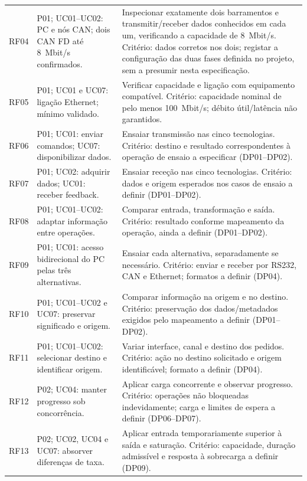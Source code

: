 \begin{longtable}{@{}>{\raggedright\arraybackslash}p{}>{\raggedright\arraybackslash}p{}>{\raggedright\arraybackslash}p{}@{}}
\addlinespace
RF04 & P01; UC01--UC02: PC e nós CAN; dois CAN FD até 8~Mbit/s confirmados. & Inspecionar exatamente dois barramentos e transmitir/receber dados conhecidos em cada um, verificando a capacidade de 8~Mbit/s. Critério: dados corretos nos dois; registar a configuração das duas fases definida no projeto, sem a presumir nesta especificação. \\
\addlinespace
RF05 & P01; UC01 e UC07: ligação Ethernet; mínimo validado. & Verificar capacidade e ligação com equipamento compatível. Critério: capacidade nominal de pelo menos 100~Mbit/s; débito útil/latência não garantidos. \\
\addlinespace
RF06 & P01; UC01: enviar comandos; UC07: disponibilizar dados. & Ensaiar transmissão nas cinco tecnologias. Critério: destino e resultado correspondentes à operação de ensaio a especificar (DP01--DP02). \\
\addlinespace
RF07 & P01; UC02: adquirir dados; UC01: receber feedback. & Ensaiar receção nas cinco tecnologias. Critério: dados e origem esperados nos casos de ensaio a definir (DP01--DP02). \\
\addlinespace
RF08 & P01; UC01--UC02: adaptar informação entre operações. & Comparar entrada, transformação e saída. Critério: resultado conforme mapeamento da operação, ainda a definir (DP01--DP02). \\
\addlinespace
RF09 & P01; UC01: acesso bidirecional do PC pelas três alternativas. & Ensaiar cada alternativa, separadamente se necessário. Critério: enviar e receber por RS232, CAN e Ethernet; formatos a definir (DP04). \\
\addlinespace
RF10 & P01; UC01--UC02 e UC07: preservar significado e origem. & Comparar informação na origem e no destino. Critério: preservação dos dados/metadados exigidos pelo mapeamento a definir (DP01--DP02). \\
\addlinespace
RF11 & P01; UC01--UC02: selecionar destino e identificar origem. & Variar interface, canal e destino dos pedidos. Critério: ação no destino solicitado e origem identificável; formato a definir (DP04). \\
\addlinespace
RF12 & P02; UC04: manter progresso sob concorrência. & Aplicar carga concorrente e observar progresso. Critério: operações não bloqueadas indevidamente; carga e limites de espera a definir (DP06--DP07). \\
\addlinespace
RF13 & P02; UC02, UC04 e UC07: absorver diferenças de taxa. & Aplicar entrada temporariamente superior à saída e saturação. Critério: capacidade, duração admissível e resposta à sobrecarga a definir (DP09). \\

\end{longtable}
